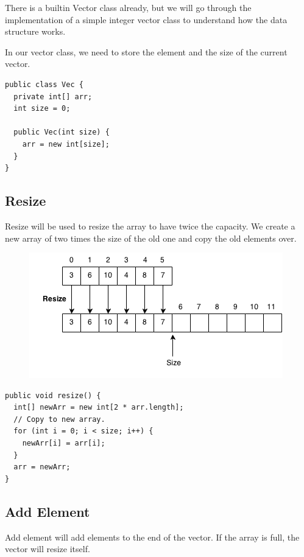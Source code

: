 \documentclass[11pt,oneside]{book}
\makeatletter
\def\maxwidth#1{\ifdim\Gin@nat@width>#1 #1\else\Gin@nat@width\fi}
\makeatother
\begin{document}
There is a builtin Vector class already, but we will go through the implementation of a simple integer vector class to understand how the data structure works.

In our vector class, we need to store the element and the size of the current vector.

\begin{lstlisting}
public class Vec {
  private int[] arr;
  int size = 0;

  public Vec(int size) {
    arr = new int[size];
  }
}
\end{lstlisting}

\subsection{Resize}

Resize will be used to resize the array to have twice the capacity. We create a new array of two times the size of the old one and copy the old elements over.

\vspace{5px}\begin{figure}[H]\centering
        \includegraphics[width=0.66\maxwidth{\textwidth}]{vector3.png}
        \end{figure}

\begin{lstlisting}
public void resize() {
  int[] newArr = new int[2 * arr.length];
  // Copy to new array.
  for (int i = 0; i < size; i++) {
    newArr[i] = arr[i];
  }
  arr = newArr;
}
\end{lstlisting}

\subsection{Add Element}

Add element will add elements to the end of the vector. If the array is full, the vector will resize itself.
\end{document}
